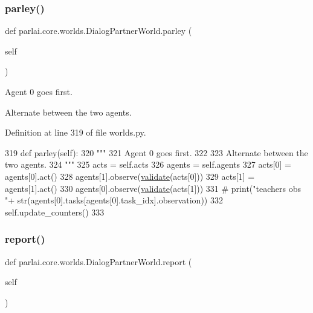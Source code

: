 \subsubsection{\texorpdfstring{parley()}{parley()}}
{\footnotesize\ttfamily def parlai.\+core.\+worlds.\+Dialog\+Partner\+World.\+parley (\begin{DoxyParamCaption}\item[{}]{self }\end{DoxyParamCaption})}

\begin{DoxyVerb}Agent 0 goes first.

Alternate between the two agents.
\end{DoxyVerb}
 

Definition at line 319 of file worlds.\+py.


\begin{DoxyCode}
319     \textcolor{keyword}{def }parley(self):
320         \textcolor{stringliteral}{"""}
321 \textcolor{stringliteral}{        Agent 0 goes first.}
322 \textcolor{stringliteral}{}
323 \textcolor{stringliteral}{        Alternate between the two agents.}
324 \textcolor{stringliteral}{        """}
325         acts = self.acts
326         agents = self.agents
327         acts[0] = agents[0].act()
328         agents[1].observe(\hyperlink{namespaceparlai_1_1core_1_1worlds_afc3fad603b7bce41dbdc9cdc04a9c794}{validate}(acts[0]))
329         acts[1] = agents[1].act()
330         agents[0].observe(\hyperlink{namespaceparlai_1_1core_1_1worlds_afc3fad603b7bce41dbdc9cdc04a9c794}{validate}(acts[1]))
331         \textcolor{comment}{# print("teachers obs "+ str(agents[0].tasks[agents[0].task\_idx].observation))}
332         self.update\_counters()
333 
\end{DoxyCode}
\mbox{\label{classparlai_1_1core_1_1worlds_1_1DialogPartnerWorld_a7cf7d09efbe302c30e885641a0189ae8}} 
\subsubsection{\texorpdfstring{report()}{report()}}
{\footnotesize\ttfamily def parlai.\+core.\+worlds.\+Dialog\+Partner\+World.\+report (\begin{DoxyParamCaption}\item[{}]{self }\end{DoxyParamCaption})}

